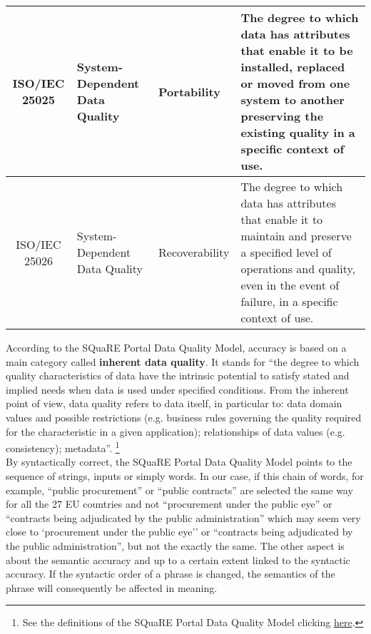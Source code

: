 \documentclass[a4paper, twoside]{report}
\let\oldfootnote\footnote
\renewcommand\footnote[1]{%
\oldfootnote{\hspace{2mm}#1}}
\begin{document}
\begin{table}[htbp]
\begin{adjustbox}{max width=\linewidth}
\begin{tabular}{cp{16em}p{10.165em}p{57.335em}}
    \midrule
    ISO/IEC 25025 & System-Dependent Data Quality & Portability & The degree to which data has attributes that enable it to be installed, replaced or moved from one system to another preserving the existing quality in a specific context of use. \\
    \midrule
    ISO/IEC 25026 & System-Dependent Data Quality & Recoverability & The degree to which data has attributes that enable it to maintain and preserve a specified level of operations and quality, even in the event of failure, in a specific context of use. \\
    \bottomrule
    \end{tabular}%
\end{adjustbox}
  \label{tab:square_concept}%
\end{table}%


According to the SQuaRE Portal Data Quality Model, accuracy is based on a main category called \textbf{inherent data quality}. It stands for ``the degree to which quality characteristics of data have the intrinsic potential to satisfy stated and implied needs when data is used under specified conditions. From the inherent point of view, data quality refers to data itself, in particular to: data domain values and possible restrictions (e.g. business rules governing the quality required for the characteristic in a given application); relationships of data values (e.g. consistency); metadata''.\footnote{See the definitions of the SQuaRE Portal Data Quality Model clicking \href{https://iso25000.com/index.php/en/iso-25000-standards/iso-25012}{here}.}\\

By syntactically correct, the SQuaRE Portal Data Quality Model points to the sequence of strings, inputs or simply words. In our case, if this chain of words, for example, ``public procurement'' or ``public contracts'' are selected the same way for all the 27 EU countries and not ``procurement under the public eye'' or ``contracts being adjudicated by the public administration'' which may seem very close to `procurement under the public eye'' or ``contracts being adjudicated by the public administration'', but not the exactly the same. The other aspect is about the semantic accuracy and up to a certain extent linked to the syntactic accuracy. If the syntactic order of a phrase is changed, the semantics of the phrase will consequently be affected in meaning.\\   

\end{document}
